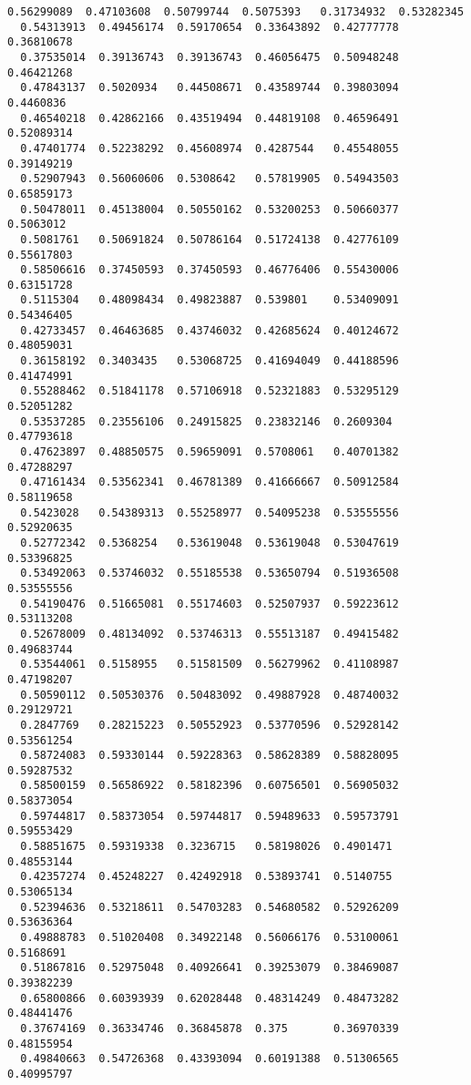 \documentclass[11pt]{article}
\begin{document}
\begin{Verbatim}[commandchars=\\\{\}]
  0.56299089  0.47103608  0.50799744  0.5075393   0.31734932  0.53282345
  0.54313913  0.49456174  0.59170654  0.33643892  0.42777778  0.36810678
  0.37535014  0.39136743  0.39136743  0.46056475  0.50948248  0.46421268
  0.47843137  0.5020934   0.44508671  0.43589744  0.39803094  0.4460836
  0.46540218  0.42862166  0.43519494  0.44819108  0.46596491  0.52089314
  0.47401774  0.52238292  0.45608974  0.4287544   0.45548055  0.39149219
  0.52907943  0.56060606  0.5308642   0.57819905  0.54943503  0.65859173
  0.50478011  0.45138004  0.50550162  0.53200253  0.50660377  0.5063012
  0.5081761   0.50691824  0.50786164  0.51724138  0.42776109  0.55617803
  0.58506616  0.37450593  0.37450593  0.46776406  0.55430006  0.63151728
  0.5115304   0.48098434  0.49823887  0.539801    0.53409091  0.54346405
  0.42733457  0.46463685  0.43746032  0.42685624  0.40124672  0.48059031
  0.36158192  0.3403435   0.53068725  0.41694049  0.44188596  0.41474991
  0.55288462  0.51841178  0.57106918  0.52321883  0.53295129  0.52051282
  0.53537285  0.23556106  0.24915825  0.23832146  0.2609304   0.47793618
  0.47623897  0.48850575  0.59659091  0.5708061   0.40701382  0.47288297
  0.47161434  0.53562341  0.46781389  0.41666667  0.50912584  0.58119658
  0.5423028   0.54389313  0.55258977  0.54095238  0.53555556  0.52920635
  0.52772342  0.5368254   0.53619048  0.53619048  0.53047619  0.53396825
  0.53492063  0.53746032  0.55185538  0.53650794  0.51936508  0.53555556
  0.54190476  0.51665081  0.55174603  0.52507937  0.59223612  0.53113208
  0.52678009  0.48134092  0.53746313  0.55513187  0.49415482  0.49683744
  0.53544061  0.5158955   0.51581509  0.56279962  0.41108987  0.47198207
  0.50590112  0.50530376  0.50483092  0.49887928  0.48740032  0.29129721
  0.2847769   0.28215223  0.50552923  0.53770596  0.52928142  0.53561254
  0.58724083  0.59330144  0.59228363  0.58628389  0.58828095  0.59287532
  0.58500159  0.56586922  0.58182396  0.60756501  0.56905032  0.58373054
  0.59744817  0.58373054  0.59744817  0.59489633  0.59573791  0.59553429
  0.58851675  0.59319338  0.3236715   0.58198026  0.4901471   0.48553144
  0.42357274  0.45248227  0.42492918  0.53893741  0.5140755   0.53065134
  0.52394636  0.53218611  0.54703283  0.54680582  0.52926209  0.53636364
  0.49888783  0.51020408  0.34922148  0.56066176  0.53100061  0.5168691
  0.51867816  0.52975048  0.40926641  0.39253079  0.38469087  0.39382239
  0.65800866  0.60393939  0.62028448  0.48314249  0.48473282  0.48441476
  0.37674169  0.36334746  0.36845878  0.375       0.36970339  0.48155954
  0.49840663  0.54726368  0.43393094  0.60191388  0.51306565  0.40995797

\end{Verbatim}
\end{document}
